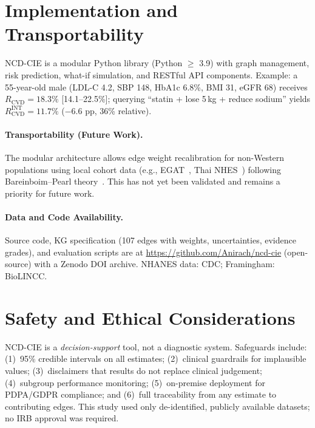 \documentclass[runningheads]{llncs}
\begin{document}
\section{Implementation and Transportability}\label{sec:impl}

NCD-CIE is a modular Python library (Python $\geq$ 3.9) with
graph management, risk prediction, what-if simulation, and RESTful
API components.
Example: a 55-year-old male (LDL-C 4.2, SBP 148, HbA1c 6.8\%, BMI
31, eGFR 68) receives $R_{\text{CVD}} = 18.3\%$ [14.1--22.5\%];
querying ``statin + lose 5\,kg + reduce sodium'' yields
$R_{\text{CVD}}^{\text{INT}} = 11.7\%$ ($-$6.6 pp, 36\% relative).

\paragraph{Transportability (Future Work).}
The modular architecture allows edge weight recalibration for
non-Western populations using local cohort data (e.g.,
EGAT~\cite{sritara2003egat}, Thai NHES~\cite{aekplakorn2011thai})
following Bareinboim--Pearl theory~\cite{bareinboim2016causal}.
This has not yet been validated and remains a priority for
future work.

\paragraph{Data and Code Availability.}
Source code, KG specification (107 edges with weights, uncertainties,
evidence grades), and evaluation scripts are at
\url{https://github.com/Anirach/ncd-cie} (open-source) with a
Zenodo DOI archive.
NHANES data: CDC; Framingham: BioLINCC.

\section{Safety and Ethical Considerations}\label{sec:ethics}

NCD-CIE is a \emph{decision-support} tool, not a diagnostic system.
Safeguards include: (1)~95\% credible intervals on all estimates;
(2)~clinical guardrails for implausible values;
(3)~disclaimers that results do not replace clinical judgement;
(4)~subgroup performance monitoring;
(5)~on-premise deployment for PDPA/GDPR compliance; and
(6)~full traceability from any estimate to contributing edges.
This study used only de-identified, publicly available datasets;
no IRB approval was required.
\end{document}
